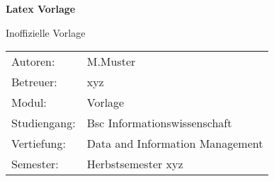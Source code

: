 \newcommand{\titel}{Latex Vorlage}
\newcommand{\untertitel}{Inoffizielle Vorlage}

\newcommand{\authors}{M.Muster}
\newcommand{\lecturer}{xyz}
\newcommand{\module}{Vorlage}
\newcommand{\program}{Bsc Informationswissenschaft}
\newcommand{\major}{Data and Information Management}
\newcommand{\semester}{Herbstsemester xyz}
 

\begin{titlepage}



\vfill

  \begin{center}
     \textbf{\textsf{\Large \titel}}
  \end{center}
  \begin{center}
    \textsf{\large \untertitel}
  \end{center}


\vfill

  \begin{flushleft}
    \begin{tabular}{l l}
      \textsf{Autoren:}			& \authors \\
      \textsf{Betreuer:}		& \lecturer \\
      \textsf{Modul:}				& \module \\
      \textsf{Studiengang:}	& \program \\
      \textsf{Vertiefung:}	& \major \\
      \textsf{Semester:}		& \semester
    \end{tabular}
  \end{flushleft}

\vfill

\end{titlepage}